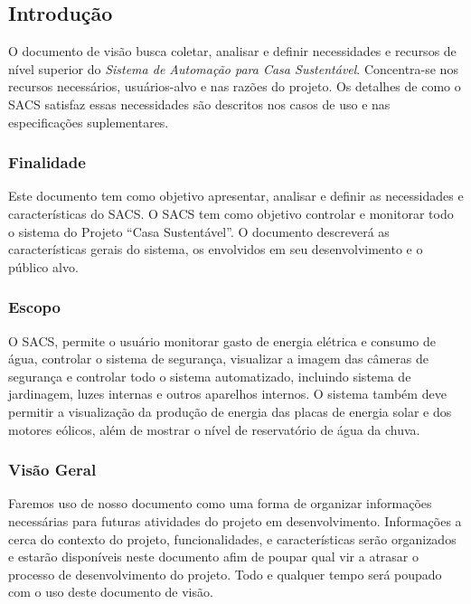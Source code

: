\subsection{Introdução}

	O documento de visão busca coletar, analisar e definir necessidades e recursos de nível superior do \textit{Sistema de Automação para Casa Sustentável}. Concentra-se nos recursos necessários, usuários-alvo e nas razões do projeto. Os detalhes de como o \gls{SACS} satisfaz essas necessidades são descritos nos casos de uso e nas especificações suplementares.

\subsubsection{Finalidade}

	Este documento tem como objetivo apresentar, analisar e definir as necessidades e características do \gls{SACS}. O \gls{SACS} tem como objetivo controlar e monitorar todo o sistema do Projeto “Casa Sustentável”. O documento descreverá as características gerais do sistema, os envolvidos em seu desenvolvimento e o público alvo.


\subsubsection{Escopo}

	O \gls{SACS}, permite o usuário monitorar gasto de energia elétrica e consumo de água, controlar o sistema de segurança, visualizar a imagem das câmeras de segurança e controlar todo o sistema automatizado, incluindo sistema de jardinagem, luzes internas e outros aparelhos internos. O sistema também deve permitir a visualização da produção de energia das placas de energia solar e dos motores eólicos, além de mostrar o nível de reservatório de água da chuva.

\subsubsection{Visão Geral}

	Faremos uso de nosso documento como uma forma de organizar informações necessárias para futuras atividades do projeto em desenvolvimento. Informações a cerca do contexto do projeto, funcionalidades, e características serão organizados e estarão disponíveis neste documento afim de poupar qual vir a atrasar o processo de desenvolvimento do projeto. Todo e qualquer tempo será poupado com o uso deste documento de visão.

